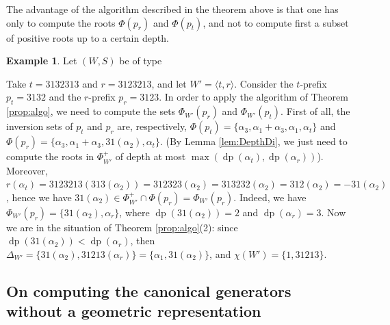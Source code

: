\documentclass{amsart}
\theoremstyle{definition}
\newtheorem{Example}[Theorem]{Example}
\newcommand{\dep}{\operatorname{dp}}
\begin{document}
The advantage of the algorithm described in the theorem above is that one has only to compute the roots $\Phi(p_r)$ and $\Phi(p_t)$, and not to compute first a subset of positive roots up to a certain depth.

 \begin{Example} Let $(W,S)$ be of type 
\begin{center}
\end{center}

Take $t=3132313$ and $r=3123213$, and let $W'=\langle t,r\rangle$. Consider the $t$-prefix $p_t=3132$ and the $r$-prefix $p_r=3123$. In order to apply the algorithm of Theorem \ref{prop:algo}, we need to compute the sets $\Phi_{W'}(p_r)$ and $\Phi_{W'}(p_t)$. First of all, the inversion sets of $p_t$ and $p_r$ are, respectively, $\Phi(p_t)=\{\alpha_3, \alpha_1+\alpha_3, \alpha_1, \alpha_t\}$ and $\Phi(p_r)=\{\alpha_3, \alpha_1+\alpha_3, 31(\alpha_2),\alpha_t\}$. (By Lemma \ref{lem:DepthDi}, we just need to compute the roots in $\Phi^+_{W'}$ of depth at most $\max(\dep(\alpha_t), \dep(\alpha_r))$). Moreover, $r(\alpha_t)=3123213(313(\alpha_2))=312323(\alpha_2)=313232(\alpha_2)=312(\alpha_2)=-31(\alpha_2)$, hence we have $31(\alpha_2)\in \Phi_{W'}^+\cap \Phi(p_r)=\Phi_{W'}(p_r)$. Indeed, we have $\Phi_{W'}(p_r)=\{31(\alpha_2), \alpha_r\}$, where $\dep(31(\alpha_2))=2$ and $\dep(\alpha_r)=3$. Now we are in the situation of Theorem \ref{prop:algo}(2): since $\dep(31(\alpha_2))<\dep(\alpha_r)$, then $\Delta_{W'}=\{31(\alpha_2), 31213(\alpha_r)\}=\{\alpha_1, 31(\alpha_2)\}$, and $\chi(W')=\{1, 31213\}$.
\end{Example}

\subsection*{On computing the canonical generators without a geometric representation}
\end{document}
